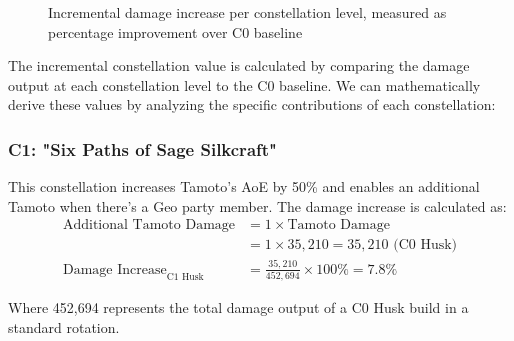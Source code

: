 \documentclass[12pt,a4paper]{article}
\begin{document}
\begin{figure}[H]
\centering
{}
\caption{Incremental damage increase per constellation level, measured as percentage improvement over C0 baseline}
\label{fig:constellation_value}
\end{figure}

The incremental constellation value is calculated by comparing the damage output at each constellation level to the C0 baseline. We can mathematically derive these values by analyzing the specific contributions of each constellation:

\subsubsection{C1: "Six Paths of Sage Silkcraft"}
This constellation increases Tamoto's AoE by 50\% and enables an additional Tamoto when there's a Geo party member. The damage increase is calculated as:
\begin{align}
\text{Additional Tamoto Damage} &= 1 \times \text{Tamoto Damage} \\
&= 1 \times 35,210 = 35,210 \text{ (C0 Husk)} \\
\text{Damage Increase}_{\text{C1 Husk}} &= \frac{35,210}{452,694} \times 100\% = 7.8\%
\end{align}

Where 452,694 represents the total damage output of a C0 Husk build in a standard rotation.
\end{document}
